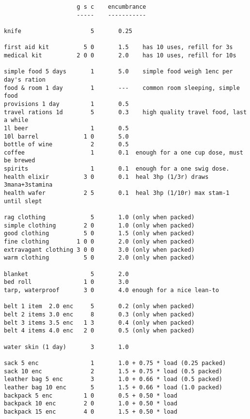\small
\goodbreak \begin{verbatim}
                     g s c    encumbrance
                     -----    -----------

knife                    5       0.25

first aid kit          5 0       1.5    has 10 uses, refill for 3s
medical kit          2 0 0       2.0    has 10 uses, refill for 10s

simple food 5 days       1       5.0    simple food weigh 1enc per day's ration
food & room 1 day        1       ---    common room sleeping, simple food
provisions 1 day         1       0.5
travel rations 1d        5       0.3    high quality travel food, last a while
1l beer                  1       0.5
10l barrel             1 0       5.0
bottle of wine           2       0.5
coffee                   1       0.1  enough for a one cup dose, must be brewed
spirits                  1       0.1  enough for a one swig dose.
health elixir          3 0       0.1  heal 3hp (1/3r) draws 3mana+3stamina
health wafer           2 5       0.1  heal 3hp (1/10r) max stam-1 until slept

rag clothing             5       1.0 (only when packed)
simple clothing        2 0       1.0 (only when packed)
good clothing          5 0       1.5 (only when packed)
fine clothing        1 0 0       2.0 (only when packed)
extravagant clothing 3 0 0       3.0 (only when packed)
warm clothing          5 0       2.0 (only when packed)

blanket                  5       2.0
bed roll               1 0       3.0
tarp, waterproof       3 0       4.0 enough for a nice lean-to

belt 1 item  2.0 enc     5       0.2 (only when packed)
belt 2 items 3.0 enc     8       0.3 (only when packed)
belt 3 items 3.5 enc   1 3       0.4 (only when packed)
belt 4 items 4.0 enc   2 0       0.5 (only when packed)

water skin (1 day)       3       1.0

sack 5 enc               1       1.0 + 0.75 * load (0.25 packed)
sack 10 enc              2       1.5 + 0.75 * load (0.5 packed)
leather bag 5 enc        3       1.0 + 0.66 * load (0.5 packed)
leather bag 10 enc       5       1.5 + 0.66 * load (1.0 packed)
backpack 5 enc         1 0       0.5 + 0.50 * load
backpack 10 enc        2 0       1.0 + 0.50 * load
backpack 15 enc        4 0       1.5 + 0.50 * load


\end{verbatim}
